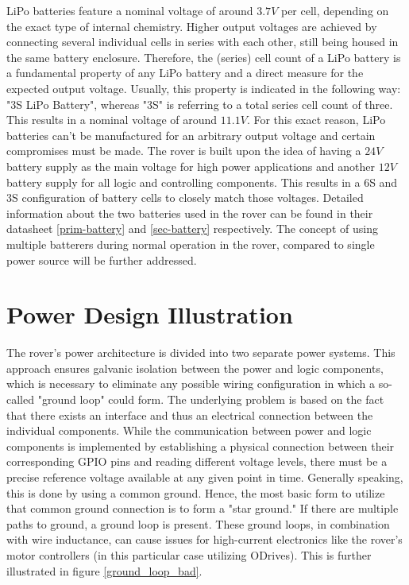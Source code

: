     \vspace{5mm} %
    
    LiPo batteries feature a nominal voltage of around $3.7V$ per cell, depending on the exact type of internal chemistry. Higher output voltages are achieved by connecting several individual cells in series with each other, still being housed in the same battery enclosure. Therefore, the (series) cell count of a LiPo battery is a fundamental property of any LiPo battery and a direct measure for the expected output voltage. Usually, this property is indicated in the following way: "3S LiPo Battery", whereas "3S" is referring to a total series cell count of three. This results in a nominal voltage of around $11.1V$. For this exact reason, LiPo batteries can't be manufactured for an arbitrary output voltage and certain compromises must be made. The rover is built upon the idea of having a $24V$ battery supply as the main voltage for high power applications and another $12V$ battery supply for all logic and controlling components. This results in a 6S and 3S configuration of battery cells to closely match those voltages. Detailed information about the two batteries used in the rover can be found in their datasheet \ref{prim-battery} and \ref{sec-battery} respectively. The concept of using multiple batterers during normal operation in the rover, compared to single power source will be further addressed.

    \clearpage %
    
\section{Power Design Illustration}

    The rover's power architecture is divided into two separate power systems. This approach ensures galvanic isolation between the power and logic components, which is necessary to eliminate any possible wiring configuration in which a so-called "ground loop" could form. The underlying problem is based on the fact that there exists an interface and thus an electrical connection between the individual components. While the communication between power and logic components is implemented by establishing a physical connection between their corresponding GPIO pins and reading different voltage levels, there must be a precise reference voltage available at any given point in time. Generally speaking, this is done by using a common ground. Hence, the most basic form to utilize that common ground connection is to form a "star ground." If there are multiple paths to ground, a ground loop is present. These ground loops, in combination with wire inductance, can cause issues for high-current electronics like the rover's motor controllers (in this particular case utilizing ODrives). This is further illustrated in figure \ref{ground_loop_bad}.
    
